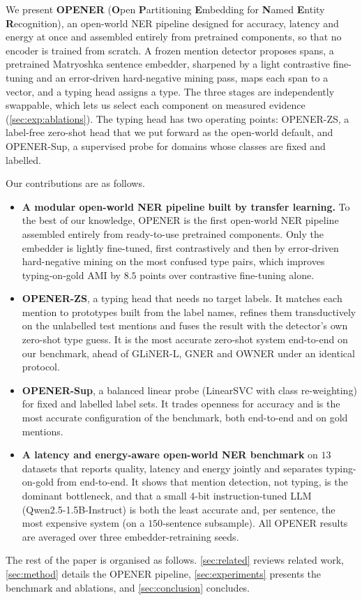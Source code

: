 \documentclass[pdflatex,sn-basic,Numbered]{sn-jnl}
\begin{document}
{We present \textbf{OPENER} (\textbf{O}pen \textbf{P}artitioning \textbf{E}mbedding for \textbf{N}amed \textbf{E}ntity \textbf{R}ecognition), an open-world NER pipeline designed for accuracy, latency and energy at once and assembled entirely from pretrained components, so that no encoder is trained from scratch.
A frozen mention detector proposes spans, a pretrained Matryoshka sentence embedder, sharpened by a light contrastive fine-tuning and an error-driven hard-negative mining pass, maps each span to a vector, and a typing head assigns a type.
The three stages are independently swappable, which lets us select each component on measured evidence (\autoref{sec:exp:ablations}).
The typing head has two operating points: OPENER-ZS, a label-free zero-shot head that we put forward as the open-world default, and OPENER-Sup, a supervised probe for domains whose classes are fixed and labelled.

Our contributions are as follows.
\begin{itemize}
\item \textbf{A modular open-world NER pipeline built by transfer learning.} To the best of our knowledge, OPENER is the first open-world NER pipeline assembled entirely from ready-to-use pretrained components. Only the embedder is lightly fine-tuned, first contrastively and then by error-driven hard-negative mining on the most confused type pairs, which improves typing-on-gold AMI by $8.5$ points over contrastive fine-tuning alone.
\item \textbf{OPENER-ZS}, a typing head that needs no target labels. It matches each mention to prototypes built from the label names, refines them transductively on the unlabelled test mentions and fuses the result with the detector's own zero-shot type guess. It is the most accurate zero-shot system end-to-end on our benchmark, ahead of GLiNER-L, GNER and OWNER under an identical protocol.
\item \textbf{OPENER-Sup}, a balanced linear probe (LinearSVC with class re-weighting) for fixed and labelled label sets. It trades openness for accuracy and is the most accurate configuration of the benchmark, both end-to-end and on gold mentions.
\item \textbf{A latency and energy-aware open-world NER benchmark} on $13$ datasets that reports quality, latency and energy jointly and separates typing-on-gold from end-to-end. It shows that mention detection, not typing, is the dominant bottleneck, and that a small 4-bit instruction-tuned LLM (Qwen2.5-1.5B-Instruct) is both the least accurate and, per sentence, the most expensive system (on a $150$-sentence subsample). All OPENER results are averaged over three embedder-retraining seeds.
\end{itemize}
The rest of the paper is organised as follows.
\autoref{sec:related} reviews related work, \autoref{sec:method} details the OPENER pipeline, \autoref{sec:experiments} presents the benchmark and ablations, and \autoref{sec:conclusion} concludes.
\par}
\end{document}
